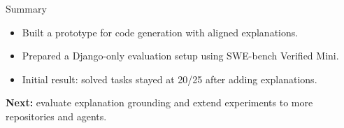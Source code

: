 \documentclass[17pt,aspectratio=169]{beamer}
\begin{document}
\begin{frame}[t]{Summary}
\raggedright
\scriptsize
\begin{itemize}\setlength{\itemsep}{0.14cm}
    \item Built a prototype for code generation with aligned explanations.
    \item Prepared a Django-only evaluation setup using SWE-bench Verified Mini.
    \item Initial result: solved tasks stayed at 20/25 after adding explanations.
\end{itemize}

\vspace{0.12cm}
\textbf{Next:} evaluate explanation grounding and extend experiments to more repositories and agents.
\end{frame}

\end{document}
